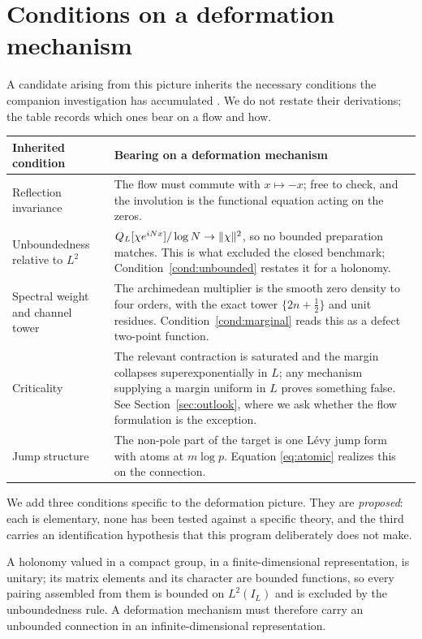 \section{Conditions on a deformation mechanism}\label{sec:conditions}

A candidate arising from this picture inherits the necessary conditions the
companion investigation has accumulated \cite{Selection}. We do not restate their
derivations; the table records which ones bear on a flow and how.

\begin{center}
\begin{tabular}{@{}p{}p{}@{}}
\toprule
Inherited condition & Bearing on a deformation mechanism\\
\midrule
Reflection invariance & The flow must commute with $x\mapsto-x$; free to check,
and the involution is the functional equation acting on the zeros.\\
Unboundedness relative to $L^2$ & $Q_L[\chi e^{iNx}]/\log N\to\lVert \chi\rVert^2$, so no
bounded preparation matches. This is what excluded the closed benchmark;
Condition~\ref{cond:unbounded} restates it for a holonomy.\\
Spectral weight and channel tower & The archimedean multiplier is the smooth zero
density to four orders, with the exact tower $\{2n+\frac12\}$ and unit residues.
Condition~\ref{cond:marginal} reads this as a defect two-point function.\\
Criticality & The relevant contraction is saturated and the margin collapses
superexponentially in $L$; any mechanism supplying a margin uniform in $L$ proves
something false. See Section~\ref{sec:outlook}, where we ask whether the flow
formulation is the exception.\\
Jump structure & The non-pole part of the target is one L\'evy jump form with
atoms at $m\log p$. Equation \eqref{eq:atomic} realizes this on the connection.\\
\bottomrule
\end{tabular}
\end{center}

We add three conditions specific to the deformation picture. They are
\emph{proposed}: each is elementary, none has been tested against a specific
theory, and the third carries an identification hypothesis that this program
deliberately does not make.

\begin{condition}\label{cond:unbounded}
A holonomy valued in a compact group, in a finite-dimensional representation, is
unitary; its matrix elements and its character are bounded functions, so every
pairing assembled from them is bounded on $L^2(I_L)$ and is excluded by the
unboundedness rule. A deformation mechanism must therefore carry an unbounded
connection in an infinite-dimensional representation.
\end{condition}

